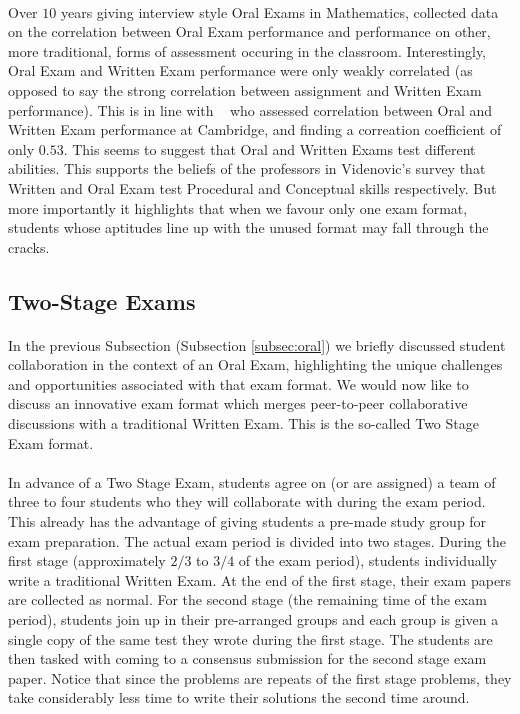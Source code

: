 \documentclass[12pt]{article}
\begin{document}
\paragraph{}
Over $10$ years giving interview style Oral Exams in Mathematics, \cite{boedigheimer2015individual} collected data on the correlation between Oral Exam performance and performance on other, more traditional, forms of assessment occuring in the classroom. Interestingly, Oral Exam and Written Exam performance were only weakly correlated (as opposed to say the strong correlation between assignment and Written Exam performance). This is in line with ~\cite{ahmed1999assessing} who assessed correlation between Oral and Written Exam performance at Cambridge, and finding a correation coefficient of only $0.53$. This seems to suggest that Oral and Written Exams test different abilities. This supports the beliefs of the professors in Videnovic's survey that Written and Oral Exam test Procedural and Conceptual skills respectively. But more importantly it highlights that when we favour only one exam format, students whose aptitudes line up with the unused format may fall through the cracks.
\subsection{Two-Stage Exams}\label{subsec:collab}
\paragraph{}
In the previous Subsection (Subsection \ref{subsec:oral}) we briefly discussed student collaboration in the context of an Oral Exam, highlighting the unique challenges and opportunities associated with that exam format. We would now like to discuss an innovative exam format which merges peer-to-peer collaborative discussions with a traditional Written Exam. This is the so-called Two Stage Exam format.
\paragraph{}
In advance of a Two Stage Exam, students agree on (or are assigned) a team of three to four students who they will collaborate with during the exam period. This already has the advantage of giving students a pre-made study group for exam preparation. The actual exam period is divided into two stages. During the first stage (approximately $2/3$ to $3/4$ of the exam period), students individually write a traditional Written Exam. At the end of the first stage, their exam papers are collected as normal. For the second stage (the remaining time of the exam period), students join up in their pre-arranged groups and each group is given a single copy of the same test they wrote during the first stage. The students are then tasked with coming to a consensus submission for the second stage exam paper. Notice that since the problems are repeats of the first stage problems, they take considerably less time to write their solutions the second time around.
\end{document}
